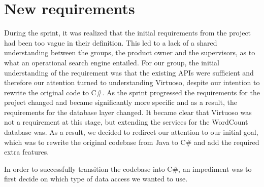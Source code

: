 \section{New requirements} \label{ssec:newRequirements}
During the sprint, it was realized that the initial requirements from the \knox{} project had been too vague in their definition. This led to a lack of a shared understanding between the groups, the product owner and the supervisors, as to what an operational search engine entailed. For our group, the initial understanding of the requirement was that the existing APIs were sufficient and therefore our attention turned to understanding Virtuoso, despite our intention to rewrite the original code to C\#. 
As the sprint progressed the requirements for the \knox{} project changed and became significantly more specific and as a result, the requirements for the database layer changed. It became clear that Virtuoso was not a requirement at this stage, but extending the services for the WordCount database was. As a result, we decided to redirect our attention to our initial goal, which was to rewrite the original codebase from Java to C\# and add the required extra features.

In order to successfully transition the codebase into C\#, an impediment was to first decide on which type of data access we wanted to use.
